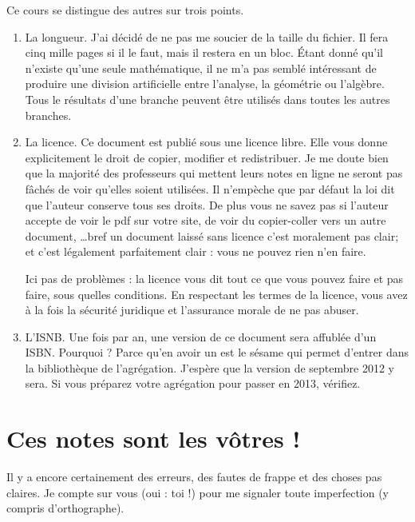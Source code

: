 Ce cours se distingue des autres sur trois points.
\begin{enumerate}
    \item
        La longueur. J'ai décidé de ne pas me soucier de la taille du fichier. Il fera cinq mille pages si il le faut, mais il restera en un bloc. Étant donné qu'il n'existe qu'une seule mathématique, il ne m'a pas semblé intéressant de produire une division artificielle entre l'analyse, la géométrie ou l'algèbre. Tous le résultats d'une branche peuvent être utilisés dans toutes les autres branches.

    \item
        La licence. Ce document est publié sous une licence libre. Elle vous donne explicitement le droit de copier, modifier et redistribuer. Je me doute bien que la majorité des professeurs qui mettent leurs notes en ligne ne seront pas fâchés de voir qu'elles soient utilisées. Il n'empèche que par défaut la loi dit que l'auteur conserve tous ses droits. De plus vous ne savez pas si l'auteur accepte de voir le pdf sur votre site, de voir du copier-coller vers un autre document, \ldots bref un document laissé sans licence c'est moralement pas clair; et c'est légalement parfaitement clair : vous ne pouvez rien n'en faire. 

        Ici pas de problèmes : la licence vous dit tout ce que vous pouvez faire et pas faire, sous quelles conditions. En respectant les termes de la licence, vous avez à la fois la sécurité juridique et l'assurance morale de ne pas abuser.
    \item
        L'ISNB. Une fois par an, une version de ce document sera affublée d'un ISBN. Pourquoi ? Parce qu'en avoir un est le sésame qui permet d'entrer dans la bibliothèque de l'agrégation. J'espère que la version de septembre 2012 y sera. Si vous préparez votre agrégation pour passer en 2013, vérifiez.       

\end{enumerate}

					\section*{Ces notes sont les vôtres !}


Il y a encore certainement des erreurs, des fautes de frappe et des choses pas claires. Je compte sur vous (oui : toi !) pour me signaler toute imperfection (y compris d'orthographe).

